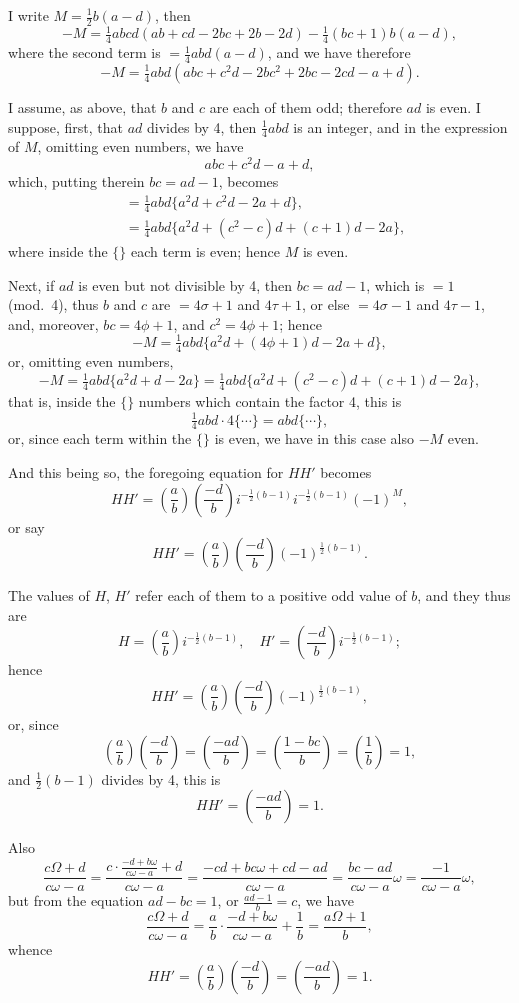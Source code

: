 \documentclass[11pt,a4paper]{book}
\begin{document}
I write $M = \frac{1}{2}b(a - d)$, then
\[
-M = \tfrac{1}{4}abcd(ab + cd - 2bc + 2b - 2d) - \tfrac{1}{4}(bc + 1)b(a - d),
\]
where the second term is $= \frac{1}{4}abd(a - d)$, and we have therefore
\[
-M = \tfrac{1}{4}abd(abc + c^2d - 2bc^2 + 2bc - 2cd - a + d).
\]

I assume, as above, that $b$ and $c$ are each of them odd; therefore $ad$ is even. I suppose, first, that $ad$ divides by 4, then $\frac{1}{4}abd$ is an integer, and in the expression of $M$, omitting even numbers, we have
\[
abc + c^2d - a + d,
\]
which, putting therein $bc = ad - 1$, becomes
\begin{align*}
&= \tfrac{1}{4}abd\{a^2d + c^2d - 2a + d\},\\
&= \tfrac{1}{4}abd\{a^2d + (c^2 - c)d + (c + 1)d - 2a\},
\end{align*}
where inside the $\{\}$ each term is even; hence $M$ is even.

Next, if $ad$ is even but not divisible by 4, then $bc = ad - 1$, which is $= 1$ (mod.~4), thus $b$ and $c$ are $= 4\sigma + 1$ and $4\tau + 1$, or else $= 4\sigma - 1$ and $4\tau - 1$, and, moreover, $bc = 4\phi + 1$, and $c^2 = 4\phi + 1$; hence
\[
-M = \tfrac{1}{4}abd\{a^2d + (4\phi + 1)d - 2a + d\},
\]
or, omitting even numbers,
\[
-M = \tfrac{1}{4}abd\{a^2d + d - 2a\} = \tfrac{1}{4}abd\{a^2d + (c^2 - c)d + (c + 1)d - 2a\},
\]
that is, inside the $\{\}$ numbers which contain the factor 4, this is
\[
\tfrac{1}{4}abd \cdot 4\{\cdots\} = abd\{\cdots\},
\]
or, since each term within the $\{\}$ is even, we have in this case also $-M$ even.

And this being so, the foregoing equation for $HH'$ becomes
\[
HH' = \left(\frac{a}{b}\right)\left(\frac{-d}{b}\right)i^{-\frac{1}{2}(b-1)}i^{-\frac{1}{2}(b-1)}(-1)^M,
\]
or say
\[
HH' = \left(\frac{a}{b}\right)\left(\frac{-d}{b}\right)(-1)^{\frac{1}{2}(b-1)}.
\]

The values of $H$, $H'$ refer each of them to a positive odd value of $b$, and they thus are
\[
H = \left(\frac{a}{b}\right)i^{-\frac{1}{2}(b-1)}, \quad H' = \left(\frac{-d}{b}\right)i^{-\frac{1}{2}(b-1)};
\]
hence
\[
HH' = \left(\frac{a}{b}\right)\left(\frac{-d}{b}\right)(-1)^{\frac{1}{2}(b-1)},
\]
or, since
\[
\left(\frac{a}{b}\right)\left(\frac{-d}{b}\right) = \left(\frac{-ad}{b}\right) = \left(\frac{1 - bc}{b}\right) = \left(\frac{1}{b}\right) = 1,
\]
and $\frac{1}{2}(b-1)$ divides by 4, this is
\[
HH' = \left(\frac{-ad}{b}\right) = 1.
\]

Also
\[
\frac{c\Omega + d}{c\omega - a} = \frac{c\cdot\frac{-d+b\omega}{c\omega-a} + d}{c\omega - a} = \frac{-cd + bc\omega + cd - ad}{c\omega - a} = \frac{bc - ad}{c\omega - a}\omega = \frac{-1}{c\omega - a}\omega,
\]
but from the equation $ad - bc = 1$, or $\frac{ad - 1}{b} = c$, we have
\[
\frac{c\Omega + d}{c\omega - a} = \frac{a}{b}\cdot\frac{-d + b\omega}{c\omega - a} + \frac{1}{b} = \frac{a\Omega + 1}{b},
\]
whence
\[
HH' = \left(\frac{a}{b}\right)\left(\frac{-d}{b}\right) = \left(\frac{-ad}{b}\right) = 1.
\]
\end{document}
